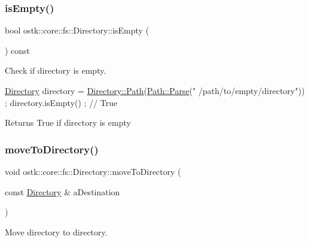 \subsubsection{\texorpdfstring{is\+Empty()}{isEmpty()}}
{\footnotesize\ttfamily bool ostk\+::core\+::fs\+::\+Directory\+::is\+Empty (\begin{DoxyParamCaption}{ }\end{DoxyParamCaption}) const}



Check if directory is empty. 


\begin{DoxyCode}
\hyperlink{classostk_1_1core_1_1fs_1_1_directory_adc893e10f55282be0d0455e9cfc5796b}{Directory} directory = \hyperlink{classostk_1_1core_1_1fs_1_1_directory_a0151dba2940d5f426b52209dc7dab2e5}{Directory::Path}(\hyperlink{classostk_1_1core_1_1fs_1_1_path_ad08539ba654f5df11c4bcb07276345ad}{Path::Parse}(\textcolor{stringliteral}{"
      /path/to/empty/directory"})) ;
directory.isEmpty() ; \textcolor{comment}{// True}
\end{DoxyCode}


\begin{DoxyReturn}{Returns}
True if directory is empty 
\end{DoxyReturn}
\mbox{\label{classostk_1_1core_1_1fs_1_1_directory_a068eb2c941fb6f9852cb4d22bf4dcec1}} 
\subsubsection{\texorpdfstring{move\+To\+Directory()}{moveToDirectory()}}
{\footnotesize\ttfamily void ostk\+::core\+::fs\+::\+Directory\+::move\+To\+Directory (\begin{DoxyParamCaption}\item[{const \hyperlink{classostk_1_1core_1_1fs_1_1_directory}{Directory} \&}]{a\+Destination }\end{DoxyParamCaption})}



Move directory to directory. 


